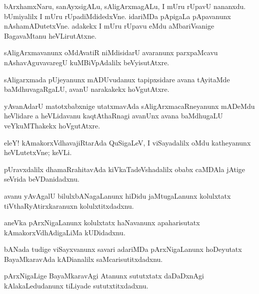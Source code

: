 \documentclass{article}
\begin{document}
\begin{mn}%
bArxhamxNaru, sanAyxsigALu, sAligArxmagALu, I mUru rUpavU nananxdu. bUmiyalilx I mUru 
rUpadiMdidedxVne. idariMDa pApigaLa pApavanunx nAshamADutetxVne. adakekx I mUru rUpavu eMdu
aMbariVsanige BagavaMtanu heVLirutAtxne.
\end{mn}

\begin{mn}%
sAligArxmavanunx oMdAvatiR niMdisidarU avaranunx parxpaMcavu nAshavAguvavaregU 
kuMBiVpAdalilx beVyisutAtxre.
\end{mn}

\begin{mn}%
sAligarxmada pUjeyanunx mADUvudanux tapipxsidare avana tAyitaMde baMdhuvagaRgaLU, avanU 
narakakekx hoVgutAtxre.
\end{mn}

\begin{mn}%
yAvanAdarU matotxbabxnige utatxmavAda sAligArxmacaRneyanunx mADeMdu heVlidare a 
heVLidavanu kaqtAthaRnagi avanUnx avana baMdhugaLU veYkuMThakekx hoVgutAtxre.
\end{mn}

\begin{mn}%
eleY! kAmakorxVdhavajiRtarAda QuSigaLeV, I viSayadalilx oMdu katheyanunx heVLutetxVne; keVLi.
\end{mn}

\begin{mn}%
pUravxdalilx dhamaRrahitavAda kiVkaTadeVshadalilx obabx caMDAla jAtige seVrida beVDanidadxnu.
\end{mn}

\begin{mn}%
avanu yAvAgalU bilulxbANagaLanunx hiDidu jaMtugaLanunx kolulxtatx tiVthaRyAtirxkaranuxn 
kolulxtitxdadxnu.
\end{mn}

\begin{mn}%
aneVka pArxNigaLanunx kolulxtatx haNavanunx apaharisutatx kAmakorxVdhAdigaLiMa kUDidadxnu.
\end{mn}

\begin{mn}%
bANada tudige viSayxvanunx savari adariMDa pArxNigaLanunx hoDeyutatx BayaMkaravAda 
kADianalilx saMcarisutitxdadxnu.
\end{mn}

\begin{mn}%
pArxNigaLige BayaMkaravAgi Atanunx sututxtatx daDaDxnAgi kAlakaLedudanunx tiLiyade 
sututxtitxdadxnu.
\end{mn}
\end{document}

